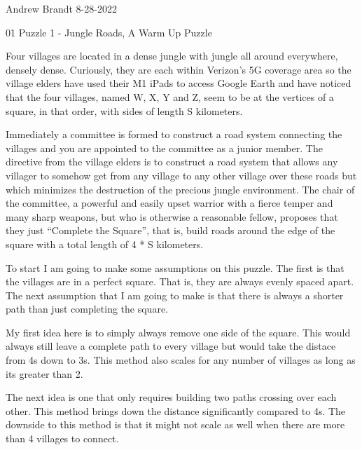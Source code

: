 \documentclass[12pt]{article}
\begin{document}
Andrew Brandt
8-28-2022

\Large 01 Puzzle 1 - Jungle Roads, A Warm Up Puzzle 

\normalsize

\vspace{5mm} %

Four villages are located in a dense jungle with jungle all around everywhere, densely dense.
Curiously, they are each within Verizon’s 5G coverage area so the village elders have used their
M1 iPads to access Google Earth and have noticed that the four villages, named W, X, Y and Z,
seem to be at the vertices of a square, in that order, with sides of length S kilometers.

\vspace{5mm}

Immediately a committee is formed to construct a road system connecting the villages and you
are appointed to the committee as a junior member. The directive from the village elders is to
construct a road system that allows any villager to somehow get from any village to any other
village over these roads but which minimizes the destruction of the precious jungle environment.
The chair of the committee, a powerful and easily upset warrior with a fierce temper and many
sharp weapons, but who is otherwise a reasonable fellow, proposes that they just “Complete the
Square”, that is, build roads around the edge of the square with a total length of 4 * S kilometers.

\vspace{5mm}


\vspace{10mm}

\noindent
To start I am going to make some assumptions on this puzzle.
The first is that the villages are in a perfect square. That is, they are always evenly spaced apart.
The next assumption that I am going to make is that there is always a shorter path than just completing the square.

\vspace{5mm}
\noindent
My first idea here is to simply always remove one side of the square.
This would always still leave a complete path to every village but would take the distace from 4s down to 3s.
This method also scales for any number of villages as long as its greater than 2.

\vspace{5mm}
\noindent
The next idea is one that only requires building two paths crossing over each other.
This method brings down the distance significantly compared to 4s.
The downside to this method is that it might not scale as well when there are more than 4 villages to connect.
\end{document}
